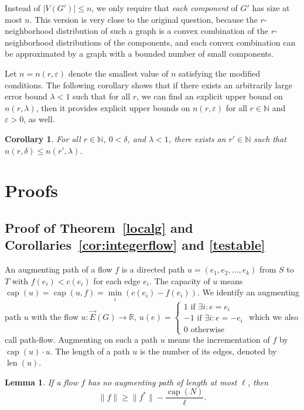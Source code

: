 \documentclass[12pt,a4paper]{article}
\newtheorem{Lemma}[Theorem]{Lemma}
\newtheorem{Corollary}[Theorem]{Corollary}
\newcommand{\len}{\operatorname{len}}
\newcommand{\capp}{\operatorname{cap}}
\newcommand{\eps}{\varepsilon}
\newcommand{\EG}{\vec{E}(G)}
\newcommand{\N}{\mathbb{N}}
\renewcommand{\:}{\colon}
\begin{document}
Instead of $\big|V(G')\big| \le n$, we only require that \emph{each component} of $G'$ has size at most $n$. This version is very close to the original question, because the $r$-neighborhood distribution of such a graph is a convex combination of the $r$-neighborhood distributions of the components, and each convex combination can be approximated by a graph with a bounded number of small components.

Let $ n = n(r, \eps)$ denote the smallest value of $n$ satisfying the modified conditions. 
The following corollary shows that if there exists an arbitrarily large error bound $\lambda < 1$ such that for all $r$, we can find an explicit upper bound on $n(r, \lambda)$, then it provides explicit upper bounds on $n(r, \eps)$ for all $r \in \N$ and $\eps > 0$, as well.

\begin{Corollary} \label{smallgraph}
For all $r \in \N$, $0 < \delta$, and $\lambda < 1$, there exists an $r'\in\N$ such that $n(r, \delta) \le n(r', \lambda)$. \end{Corollary}


\section{Proofs}

\subsection{Proof of Theorem~\ref{localg} and Corollaries~\ref{cor:integerflow} and \ref{testable}}

An augmenting path of a flow $f$ is a directed path $u = (e_1, e_2, \ldots, e_k)$ from $S$ to $T$ with $f(e_i) < c(e_i)$ for each edge $e_i$. The capacity of $u$ means $\capp(u) = \capp(u, f) = \min\limits_{i}(c(e_i) - f(e_i))$. We identify an augmenting path $u$ with the flow $u\: \EG \rightarrow \mathbb{R}$, $u(e) =
\begin{cases}
1\text{ if }\exists i\: e = e_i\\
-1\text{ if }\exists i\: e = - e_i\\
0\text{ otherwise}
\end{cases}$
which we also call path-flow. Augmenting on such a path $u$ means the incrementation of $f$ by $\capp(u) \cdot u$. 
The length of a path $u$ is the number of its edges, denoted by $\len(u)$. 

\begin{Lemma} \label{approx1}
If a flow $f$ has no augmenting path of length at most $\ell$, then
\begin{equation} \label{approx1eq}
\big\|f\big\| \ge \big\|f^*\big\| - \frac{\capp(N)}{\ell}.
\end{equation}
\end{Lemma}
\end{document}
